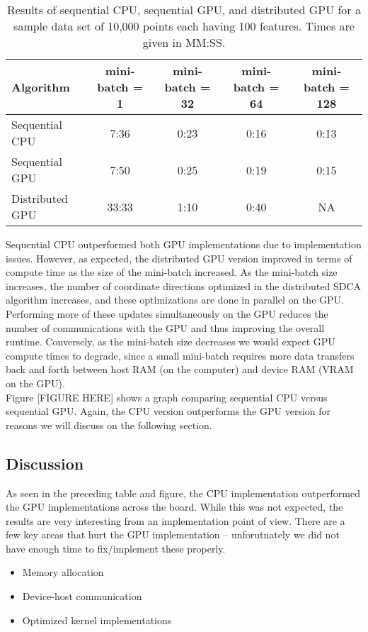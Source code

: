 \documentclass{article}
\begin{document}
\begin{table}
  \centering
  \caption{Results of sequential CPU, sequential GPU, and distributed GPU
    for a sample data set of 10,000 points each having 100 features. Times are
    given in MM:SS.}
  \label{tab:res-scale}
  \begin{tabular}{l|cccc}
      \textbf{Algorithm} & \textbf{mini-batch = 1} & \textbf{mini-batch = 32} &
      \textbf{mini-batch = 64} & \textbf{mini-batch = 128}\\\hline
      Sequential CPU & 7:36 & 0:23 & 0:16 & 0:13\\
      Sequential GPU & 7:50 & 0:25 & 0:19 & 0:15\\
      Distributed GPU & 33:33 & 1:10 & 0:40 & NA\\\hline
  \end{tabular}
\end{table}

Sequential CPU outperformed both GPU implementations due to implementation
issues. However, as expected, the distributed GPU version improved in terms of
compute time as the size of the mini-batch increased. As the mini-batch size
increases, the number of coordinate directions optimized in the distributed
SDCA algorithm increases, and these optimizations are done in parallel on the
GPU. Performing more of these updates simultaneously on the GPU reduces the
number of communications with the GPU and thus improving  the overall runtime.
Conversely, as the mini-batch size decreases we would expect GPU compute times
to degrade, since a small mini-batch requires more data transfers back and
forth between host RAM (on the computer) and device RAM (VRAM on the GPU).\\

Figure [FIGURE HERE] shows a graph comparing sequential CPU versus sequential
GPU. Again, the CPU version outperforms the GPU version for reasons we will
discuss on the following section.

\subsection{Discussion}
As seen in the preceding table and figure, the CPU implementation outperformed
the GPU implementations across the board. While this was not expected, the
results are very interesting from an implementation point of view. There are a
few key areas that hurt the GPU implementation -- unforutnately we did not have
enough time to fix/implement these properly.
\begin{itemize}
    \item Memory allocation
    \item Device-host communication
    \item Optimized kernel implementations
\end{itemize}
\end{document}
